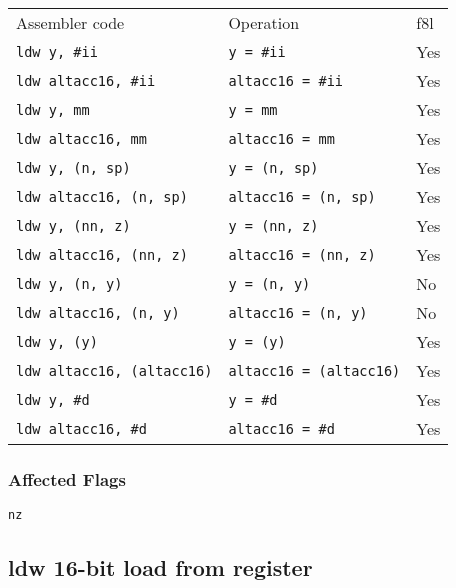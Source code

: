 \documentclass{book}
\begin{document}
\begin{tabular}{l l l}
Assembler code                    & Operation                      & f8l \\
\texttt{ldw y, \#ii}              & \texttt{y = \#ii}              & Yes \\
\texttt{ldw altacc16, \#ii}       & \texttt{altacc16 = \#ii}       & Yes \\
\texttt{ldw y, mm}                & \texttt{y = mm}                & Yes \\
\texttt{ldw altacc16, mm}         & \texttt{altacc16 = mm}         & Yes \\
\texttt{ldw y, (n, sp)}           & \texttt{y = (n, sp)}           & Yes \\
\texttt{ldw altacc16, (n, sp)}    & \texttt{altacc16 = (n, sp)}    & Yes \\
\texttt{ldw y, (nn, z)}           & \texttt{y = (nn, z)}           & Yes \\
\texttt{ldw altacc16, (nn, z)}    & \texttt{altacc16 = (nn, z)}    & Yes \\
\texttt{ldw y, (n, y)}            & \texttt{y = (n, y)}            & No \\
\texttt{ldw altacc16, (n, y)}     & \texttt{altacc16 = (n, y)}     & No \\
\texttt{ldw y, (y)}               & \texttt{y = (y)}               & Yes \\
\texttt{ldw altacc16, (altacc16)} & \texttt{altacc16 = (altacc16)} & Yes \\
\texttt{ldw y, \#d}               & \texttt{y = \#d}               & Yes \\
\texttt{ldw altacc16, \#d}        & \texttt{altacc16 = \#d}        & Yes \\
\end{tabular}

\subsubsection*{Affected Flags}

\texttt{nz}


\subsection{ldw 16-bit load from register}
\end{document}
